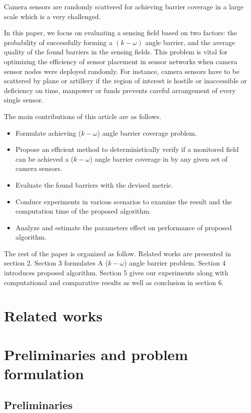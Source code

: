 \documentclass[3p]{elsarticle}
\begin{document}
Camera sensors are randomly scattered for achieving barrier coverage in a large scale which is a very challenged.\par
%
In this paper, we focus on evaluating a sensing field based on two factors: the probability of successfully forming a $(k-\omega)$ angle barrier, and the average quality of the found barriers in the sensing fields. This problem is vital for optimizing the efficiency of sensor placement in sensor networks when camera sensor nodes were deployed randomly. For instance, camera sensors have to be scattered by plane or artillery if the region of interest is hostile or inaccessible or deficiency on time, manpower or funds prevents careful arrangement of every single sensor.\par
%
The main contributions of this article are as follows. 
\begin{itemize}
	\item Formulate achieving ($k-\omega$) angle barrier coverage problem.
	\item Propose an efficient method to deterministically verify if a monitored field can be achieved a ($k-\omega$) angle barrier coverage in by any given set of camera sensors. 
	\item Evaluate the found barriers with the devised metric.
	\item Conduce experiments in various scenarios to examine the result and the computation time of the proposed algorithm.
	\item Analyze and estimate the parameters effect on performance of proposed algorithm.
\end{itemize}
%
The rest of the paper is organized as follow. Related works are presented in section 2. Section 3 formulates A ($k-\omega$) angle barrier problem. Section 4 introduces proposed algorithm. Section 5 gives our experiments along with computational and comparative results as well as conclusion in section 6.
%

\section{Related works}


\section{Preliminaries and problem formulation}
\subsection{Preliminaries}


\end{document}
